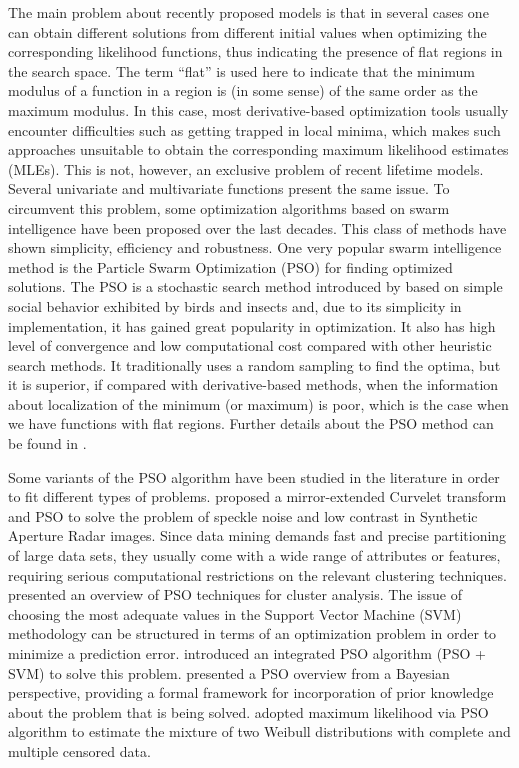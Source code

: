 \documentclass[10pt,letterpaper]{article}
\begin{document}
The main problem about recently proposed models is that in several cases one can obtain different solutions from different
initial values when optimizing the corresponding likelihood functions, thus indicating the presence of flat regions in the search space.
The term ``flat'' is used here to indicate that the minimum modulus of a function in a region is (in some sense) of the same order as the maximum modulus.
In this case, most derivative-based optimization tools usually encounter difficulties such as getting trapped in local minima,
which makes such approaches unsuitable to obtain the corresponding maximum likelihood estimates (MLEs).
This is not, however, an exclusive problem of recent lifetime models.
Several univa\-ria\-te and multivariate functions present the same issue.
To circumvent this problem, some optimization algorithms based on swarm intelligence have been proposed over the last decades.
This class of methods have shown simplicity, efficiency and robustness.
One  very popular swarm intelligence method is the Particle Swarm Optimization (PSO) for finding optimized solutions.
The PSO is a stochastic search method introduced by \cite{kennedyeberhart1995} based on simple social behavior exhibited
by birds and insects and, due to its simplicity in implementation, it has gained great popularity in optimization.
It also has high level of convergence and low computational cost  compared with other heuristic search methods.
It traditionally uses a random sampling to find the optima, but it is
superior, if compared with derivative-based methods, when the information about localization of the minimum (or maximum) is poor, which is the case when we have functions with flat regions.
Further details about the PSO method can be found in \cite{kennedyetal2001}.


Some variants of the PSO algorithm have been studied in the literature in order to fit different types of problems.
\cite{yingetal2010} proposed a mirror-extended Curvelet transform and PSO to solve the problem of speckle noise and low contrast in Synthetic Aperture Radar images.
Since data mining demands fast and precise partitioning of large data sets, they usually come with a wide range of attributes or features, requiring
serious computational restrictions on the relevant clustering techniques.
\cite{khanetal2010} presented an overview of PSO techniques for cluster analysis.
The issue of choosing the most adequate values in the Support Vector Machine (SVM) methodology can be structured in terms of an optimization problem
in order to minimize a prediction error.
\cite{linsetal2012} introduced an integrated PSO algorithm (PSO + SVM) to solve this problem.
\cite{andras2012} presented a PSO overview from a Bayesian perspective,  providing a formal framework for incorporation of prior knowledge about the
problem that is being solved.
\cite{wanghuang2013} adopted maximum likelihood via PSO algorithm to estimate the mixture of two Weibull distributions with complete and multiple censored data.
\end{document}
